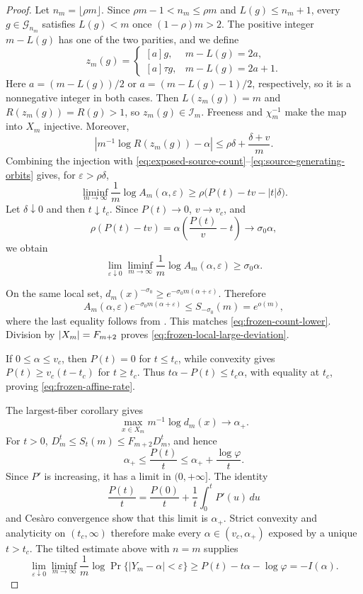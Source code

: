 \begin{proof}
Let \(n_m=\lfloor\rho m\rfloor\).  Since
\(\rho m-1<n_m\le\rho m\) and \(L(g)\le n_m+1\), every
\(g\in\mathcal G_{n_m}\) satisfies \(L(g)<m\) once
\((1-\rho)m>2\).  The positive integer \(m-L(g)\) has one of the two
parities, and we define
\[
 z_m(g)=
 \begin{cases}
 [a]g,&m-L(g)=2a,\\
 [a]\tau g,&m-L(g)=2a+1.
 \end{cases}
\]
Here \(a=(m-L(g))/2\) or \(a=(m-L(g)-1)/2\), respectively, so it is a
nonnegative integer in both cases.
Then \(L(z_m(g))=m\) and \(R(z_m(g))=R(g)>1\), so
\(z_m(g)\in\mathcal I_m\).  Freeness and \(\chi_m^{-1}\) make the map into
\(X_m\) injective.  Moreover,
\[
 \left|m^{-1}\log R(z_m(g))-\alpha\right|
 \le \rho\delta+\frac{\delta+v}{m}.
\]
Combining the injection with
\eqref{eq:exposed-source-count}--\eqref{eq:source-generating-orbits} gives,
for \(\varepsilon>\rho\delta\),
\begin{equation}
 \liminf_{m\to\infty}\frac1m\log A_m(\alpha,\varepsilon)
 \ge\rho\bigl(P(t)-tv-|t|\delta\bigr).
 \label{eq:orbit-filling-lower-bound}
\end{equation}
Let \(\delta\downarrow0\) and then \(t\downarrow t_c\).  Since
\(P(t)\to0\), \(v\to v_c\), and
\[
 \rho(P(t)-tv)=\alpha\left(\frac{P(t)}v-t\right)
 \longrightarrow\sigma_0\alpha,
\]
we obtain
\begin{equation}
 \lim_{\varepsilon\downarrow0}\liminf_{m\to\infty}
 \frac1m\log A_m(\alpha,\varepsilon)\ge\sigma_0\alpha.
 \label{eq:frozen-count-lower}
\end{equation}

On the same local set,
\(d_m(x)^{-\sigma_0}\ge
e^{-\sigma_0m(\alpha+\varepsilon)}\).  Therefore
\[
 A_m(\alpha,\varepsilon)e^{-\sigma_0m(\alpha+\varepsilon)}
 \le S_{-\sigma_0}(m)=e^{o(m)},
\]
where the last equality follows from
.  This matches
\eqref{eq:frozen-count-lower}.  Division by
\(\lvert X_m \rvert=F_{m+2}\) proves \eqref{eq:frozen-local-large-deviation}.

If \(0\le\alpha\le v_c\), then \(P(t)=0\) for \(t\le t_c\), while
convexity gives \(P(t)\ge v_c(t-t_c)\) for \(t\ge t_c\).  Thus
\(t\alpha-P(t)\le t_c\alpha\), with equality at \(t_c\), proving
\eqref{eq:frozen-affine-rate}.

The largest-fiber corollary gives
\[
 \max_{x\in X_m}m^{-1}\log d_m(x)\longrightarrow\alpha_+.
\]
For \(t>0\),
\(D_m^t\le S_t(m)\le F_{m+2}D_m^t\), and hence
\[
 \alpha_+\le\frac{P(t)}t
 \le\alpha_++\frac{\log\varphi}{t}.
\]
Since \(P'\) is increasing, it has a limit in \((0,+\infty]\).  The identity
\[
 \frac{P(t)}t=\frac{P(0)}t+\frac1t\int_0^tP'(u)\,du
\]
and Ces\`aro convergence show that this limit is \(\alpha_+\).  Strict
convexity and analyticity on \((t_c,\infty)\) therefore make every
\(\alpha\in(v_c,\alpha_+)\) exposed by a unique \(t>t_c\).  The tilted
estimate above with \(n=m\) supplies
\begin{equation}
 \lim_{\varepsilon\downarrow0}\liminf_{m\to\infty}
 \frac1m\log\Pr\{|Y_m-\alpha|<\varepsilon\}
 \ge P(t)-t\alpha-\log\varphi=-I(\alpha).
 \label{eq:exposed-local-large-deviation}
\end{equation}


\end{proof}
